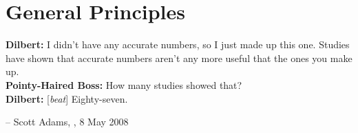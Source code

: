 \section{General Principles}
\begin{tcolorbox}[title=Data Validation]
\textbf{Dilbert:} I didn't have any accurate numbers, so I just made up this one. Studies have shown that accurate numbers aren't any more useful that the ones you make up. \\ 
\textbf{Pointy-Haired Boss:} How many studies showed that? \\ 
\textbf{Dilbert:} [\textit{beat}] Eighty-seven.\\[-0.6cm]
\begin{flushright}
-- Scott Adams, , 8 May 2008
\end{flushright}
\end{tcolorbox}
\noindent
